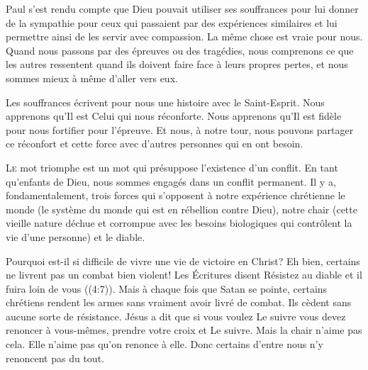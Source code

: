 Paul s'est rendu compte que Dieu pouvait utiliser
 ses souffrances pour lui donner de la sympathie
 pour ceux qui passaient par des expériences similaires
 et lui permettre ainsi de les servir avec compassion.
 La même chose est vraie pour nous.
 Quand nous passons par des épreuves ou des tragédies,
 nous comprenons ce que les autres ressentent
 quand ils doivent faire face à leurs propres pertes,
 et nous sommes mieux à même d'aller vers eux.

Les souffrances écrivent pour nous une histoire
 avec le Saint-Esprit.
 Nous apprenons qu'Il est Celui qui nous réconforte.
 Nous apprenons qu'Il est fidèle pour nous fortifier pour l'épreuve.
 Et nous, à notre tour, nous pouvons partager ce réconfort
 et cette force avec d'autres personnes qui en ont besoin.

\dvrule








\lettrine{L}{e} mot \Og triomphe \Fg{}
 est un mot qui présuppose l'existence d'un conflit.
 En tant qu'enfants de Dieu,
 nous sommes engagés dans un conflit permanent.
 Il y a, fondamentalement, trois forces qui s'opposent
 à notre expérience chrétienne\frcolon{} le monde
 (le système du monde qui est en rébellion contre Dieu),
 notre chair (cette vieille nature déchue et corrompue
 avec les besoins biologiques qui contrôlent
 la vie d'une personne) et le diable.


Pourquoi est-il si difficile de vivre une vie de victoire en Christ?
 Eh bien, certains ne livrent pas un combat bien violent!
 Les Écritures disent\frcolon{} 
 \Og Résistez au diable et il fuira loin de vous \Fg{}
 ((4:7)).
 Mais à chaque fois que Satan se pointe, certains chrétiens rendent
 les armes sans vraiment avoir livré de combat.
 Ils cèdent sans aucune sorte de résistance.
 Jésus a dit que si vous voulez Le suivre vous devez renoncer à vous-mêmes,
 prendre votre croix et Le suivre.
 Mais la chair n'aime pas cela. Elle n'aime pas qu'on renonce à elle.
 Donc certains d'entre nous n'y renoncent pas du tout.

